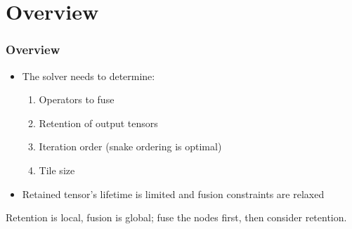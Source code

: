 \section{Overview}
\begin{frame}
\frametitle{Overview}

\begin{itemize}
  \item The solver needs to determine:
  \begin{enumerate}
    \item Operators to fuse
    \item Retention of output tensors
    \item Iteration order (snake ordering is optimal)
    \item Tile size
  \end{enumerate}
  \pause
  \item Retained tensor's lifetime is limited and fusion constraints are relaxed
\end{itemize}
\pause
\begin{tcolorbox}[title={Our overall strategy}]
  Retention is local, fusion is global; fuse the nodes first, then consider retention.
\end{tcolorbox}
\end{frame}

